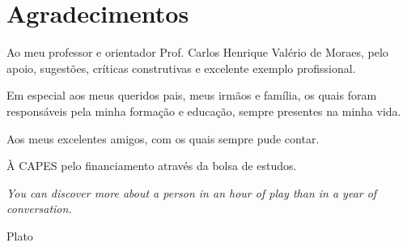 \chapter*{Agradecimentos}

Ao meu professor e orientador Prof. Carlos Henrique Valério de Moraes, pelo apoio, sugestões, críticas construtivas e excelente exemplo profissional.

Em especial aos meus queridos pais, meus irmãos e família, os quais foram responsáveis pela minha formação e educação, sempre presentes na minha vida.

Aos meus excelentes amigos, com os quais sempre pude contar.

À CAPES pelo financiamento através da bolsa de estudos.

\vfill

\hfill

\begin{flushright}

\small
\parbox{.6\textwidth}{\emph{You can discover more about a person in an hour of play than in a year of conversation.}}

Plato

\end{flushright}